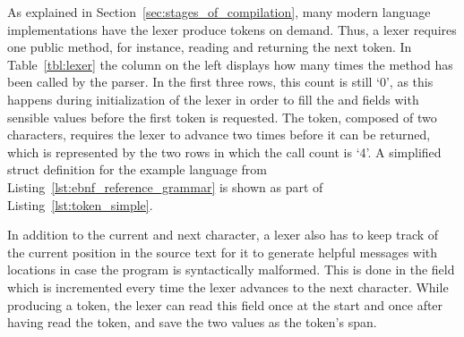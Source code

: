 \begin{table}[h]
\end{table}

As explained in Section~\ref{sec:stages_of_compilation}, many modern language implementations have the lexer produce tokens on demand.
Thus, a lexer requires one public method,  for instance, reading and returning the next token.
In Table~\ref{tbl:lexer} the column on the left displays how many times the  method has been called by the parser.
In the first three rows, this count is still `0', as this happens during initialization of the lexer in order to fill the  and  fields with sensible values before the first token is requested.
The  token, composed of two \qVerb{*} characters, requires the lexer to advance two times before it can be returned, which is represented by the two rows in which the call count is `4'.
A simplified  struct definition for the example language from Listing~\ref{lst:ebnf_reference_grammar} is shown as part of Listing~\ref{lst:token_simple}.


In addition to the current and next character, a lexer also has to keep track of the current position in the source text for it to generate helpful messages with locations in case the program is syntactically malformed.
This is done in the  field which is incremented every time the lexer advances to the next character.
While producing a token, the lexer can read this field once at the start and once after having read the token, and save the two values as the token's span.

